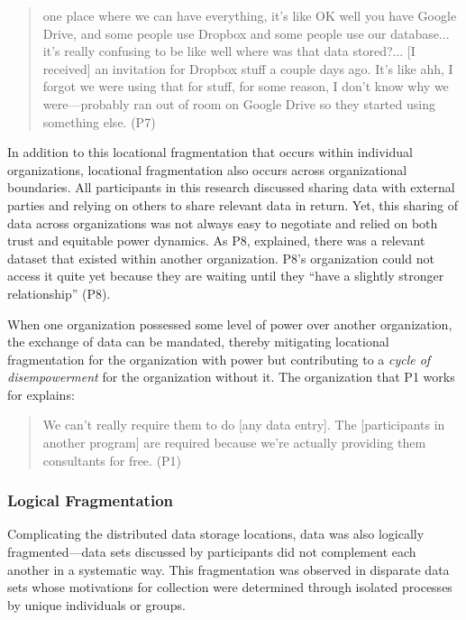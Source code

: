 \begin{quote} one place where we can have everything, it’s like OK well you have Google Drive, and some people use Dropbox and some people use our database... it’s really confusing to be like well where was that data stored?... [I received] an invitation for Dropbox stuff a couple days ago. It’s like ahh, I forgot we were using that for stuff, for some reason, I don’t know why we were—probably ran out of room on Google Drive so they started using something else. (P7)\end{quote}

In addition to this locational fragmentation that occurs within individual organizations, locational fragmentation also occurs across organizational boundaries. All participants in this research discussed sharing data with external parties and relying on others to share relevant data in return. Yet, this sharing of data across organizations was not always easy to negotiate and relied on both trust and equitable power dynamics. As P8, explained, there was a relevant dataset that existed within another organization. P8’s organization could not access it quite yet because they are waiting until they “have a slightly stronger relationship” (P8).

When one organization possessed some level of power over another organization, the exchange of data can be mandated, thereby mitigating locational fragmentation for the organization with power but contributing to a \textit{cycle of disempowerment} for the organization without it. The organization that P1 works for explains:

\begin{quote}\singlespacing We can’t really require them to do [any data entry]. The [participants in another program] are required because we’re actually providing them consultants for free. (P1)\end{quote}

\subsubsection{Logical Fragmentation}

Complicating the distributed data storage locations, data was also logically fragmented---data sets discussed by participants did not complement each another in a systematic way. This fragmentation was observed in disparate data sets whose motivations for collection were determined through isolated processes by unique individuals or groups.


